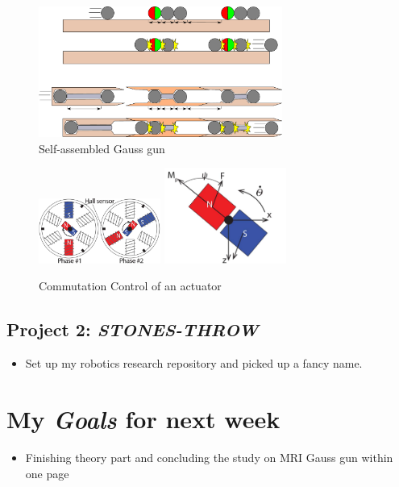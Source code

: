 \begin{figure}[h]
\begin{center}
\includegraphics[width=8cm]{fig/GaussGunToyAndMRI}
\caption{Self-assembled Gauss gun}
\end{center}
\end{figure}

\begin{figure}[h]
	\begin{center}
		\includegraphics[width=4cm]{fig/CommutationControl1}
		\includegraphics[width=4cm]{fig/CommutationControl2}
		\caption{Commutation Control of an actuator}
	\end{center}
\end{figure}
\subsection{Project 2: \emph{STONES-THROW}}
\begin{itemize}
	\item Set up my robotics research repository and picked up a fancy name.
\end{itemize}


\section{My \emph{Goals} for next week}

\begin{itemize}
\item Finishing theory part and concluding the study on MRI Gauss gun within one page
\end{itemize}

